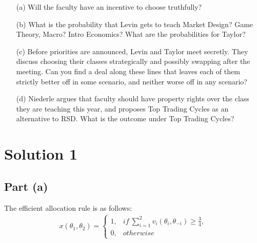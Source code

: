 \documentclass[10pt,a4paper]{article}
\begin{document}
  \begin{enumerate}
      \item[(a)] Will the faculty have an incentive to choose truthfully?
      \item[(b)] What is the probability that Levin gets to teach Market Design? Game Theory, Macro? Intro Economics? What are the probabilities for Taylor?
      \item[(c)] Before priorities are announced, Levin and Taylor meet secretly. They discuss choosing their classes strategically and possibly swapping after the meeting. Can you find a deal along these lines that leaves each of them strictly better off in some scenario, and neither worse off in any scenario?
      \item[(d)] Niederle argues that faculty should have property rights over the class they are teaching this year, and proposes Top Trading Cycles as an alternative to RSD. What is the outcome under Top Trading Cycles?
  \end{enumerate}

\section*{Solution 1}
  \subsection*{Part (a)}
    The efficient allocation rule is as follows:
    \begin{gather*}
      x(\theta_1,\theta_2) = \begin{cases}
        1, & if \ \sum\limits_{i=1}^2v_i(\theta_i,\theta_{-i})\geq\frac{3}{4}, \\
        0, & otherwise
      \end{cases}
    \end{gather*}
\end{document}
